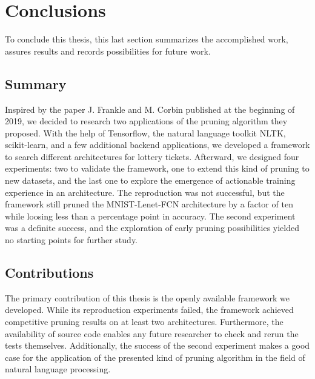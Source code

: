\chapter{Conclusions}
\label{ch:closure}

To conclude this thesis, this last section summarizes the accomplished work, assures results and records possibilities for future work.

\section{Summary}
Inspired by the paper J. Frankle and M. Corbin published at the beginning of 2019, we decided to research two applications of the pruning algorithm they proposed. With the help of Tensorflow, the natural language toolkit NLTK, scikit-learn, and a few additional backend applications, we developed a framework to search different architectures for lottery tickets. Afterward, we designed four experiments: two to validate the framework, one to extend this kind of pruning to new datasets, and the last one to explore the emergence of actionable training experience in an architecture.  The reproduction was not successful, but the framework still pruned the MNIST-Lenet-FCN architecture by a factor of ten while loosing less than a percentage point in accuracy. The second experiment was a definite success, and the exploration of early pruning possibilities yielded no starting points for further study.

\section{Contributions}
The primary contribution of this thesis is the openly available framework we developed. While its reproduction experiments failed, the framework achieved competitive pruning results on at least two architectures. Furthermore, the availability of source code enables any future researcher to check and rerun the tests themselves. Additionally, the success of the second experiment makes a good case for the application of the presented kind of pruning algorithm in the field of natural language processing.

